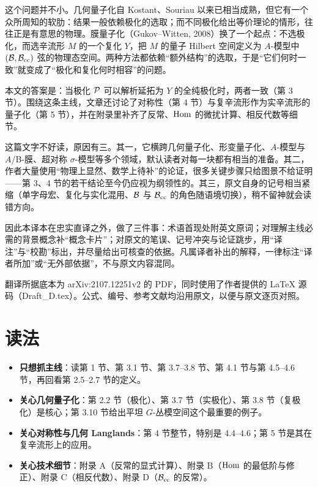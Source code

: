 这个问题并不小。几何量子化自 Kostant、Souriau 以来已相当成熟，但它有一个众所周知的软肋：结果一般依赖极化的选取；而不同极化给出等价理论的情形，往往正是有意思的物理。膜量子化（Gukov–Witten, 2008）换了一个起点：不选极化，而选辛流形 $M$ 的一个复化 $Y$，把 $M$ 的量子 Hilbert 空间定义为 $A$-模型中 $(\B,\B_\cc)$ 弦的物理态空间。两种方法都依赖“额外结构”的选取，于是“它们何时一致”就变成了“极化和复化何时相容”的问题。

本文的答案是：当极化 $\P$ 可以解析延拓为 $Y$ 的全纯极化时，两者一致（第 3 节）。围绕这条主线，文章还讨论了对称性（第 4 节）与复辛流形作为实辛流形的量子化（第 5 节），并在附录里补齐了反常、$\Hom$ 的微扰计算、相反代数等细节。

这篇文字不好读，原因有三。其一，它横跨几何量子化、形变量子化、$A$-模型与 $A$/B-膜、超对称 $\sigma$-模型等多个领域，默认读者对每一块都有相当的准备。其二，作者大量使用“物理上显然、数学上待补”的论证，很多关键步骤只给图景不给证明——第 3、4 节的若干结论至今仍应视为纲领性的。其三，原文自身的记号相当紧缩（单字母宏、复化与实化混用、$\B$ 与 $\B_\cc$ 的角色随语境切换），稍不留神就会读错方向。

因此本译本在忠实直译之外，做了三件事：术语首现处附英文原词；对理解主线必需的背景概念补“概念卡片”；对原文的笔误、记号冲突与论证跳步，用“译注”与“校勘”标出，并尽量给出可核查的依据。凡属译者补出的解释，一律标注“译者所加”或“无外部依据”，不与原文内容混同。

翻译所据底本为 arXiv:2107.12251v2 的 PDF，同时使用了作者提供的 LaTeX 源码（Draft\_D.tex）。公式、编号、参考文献均沿用原文，以便与原文逐页对照。

\section*{读法}

\begin{itemize}[leftmargin=1.6em,itemsep=0.25em]
\item \textbf{只想抓主线}：读第 1 节、第 3.1 节、第 3.7--3.8 节、第 4.1 节与第 4.5--4.6 节，再回看第 2.5--2.7 节的定义。
\item \textbf{关心几何量子化}：第 2.2 节（极化）、第 3.7 节（实极化）、第 3.8 节（复极化）是核心；第 3.10 节给出平坦 $G$-丛模空间这个最重要的例子。
\item \textbf{关心对称性与几何 Langlands}：第 4 节整节，特别是 4.4--4.6；第 5 节是其在复辛流形上的应用。
\item \textbf{关心技术细节}：附录 A（反常的显式计算）、附录 B（$\Hom$ 的最低阶与修正）、附录 C（相反代数）、附录 D（$\B_\cc$ 的反常）。
\end{itemize}

